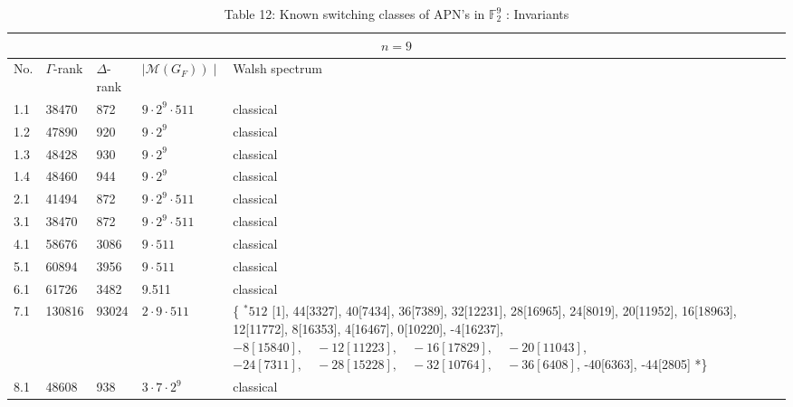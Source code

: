 \documentclass[10pt]{article}
\begin{document}
\begin{table}[h]
\begin{center}
\begin{tabular}{|l|l|l|l|l|}
\hline
\multicolumn{5}{|c|}{$n=9$} \\
\hline
No. & $\Gamma$-rank & $\Delta$-rank & $\left.\mid \mathcal{M}\left(G_{F}\right)\right) \mid$ & Walsh spectrum \\
\hline
1.1 & 38470 & 872 & $9 \cdot 2^{9} \cdot 511$ & classical \\
\hline
1.2 & 47890 & 920 & $9 \cdot 2^{9}$ & classical \\
\hline
1.3 & 48428 & 930 & $9 \cdot 2^{9}$ & classical \\
\hline
1.4 & 48460 & 944 & $9 \cdot 2^{9}$ & classical \\
\hline
2.1 & 41494 & 872 & $9 \cdot 2^{9} \cdot 511$ & classical \\
\hline
3.1 & 38470 & 872 & $9 \cdot 2^{9} \cdot 511$ & classical \\
\hline
4.1 & 58676 & 3086 & $9 \cdot 511$ & classical \\
\hline
5.1 & 60894 & 3956 & $9 \cdot 511$ & classical \\
\hline
6.1 & 61726 & 3482 & 9.511 & classical \\
\hline
7.1 & 130816 & 93024 & $2 \cdot 9 \cdot 511$ & \{ ${ }^{*} 512$ [1], 44[3327], 40[7434], 36[7389], 32[12231], 28[16965], 24[8019], 20[11952], 16[18963], 12[11772], 8[16353], 4[16467], 0[10220], -4[16237], $-8[15840], \quad-12[11223], \quad-16[17829], \quad-20[11043]$, $-24[7311], \quad-28[15228], \quad-32[10764], \quad-36[6408]$, -40[6363], -44[2805] *\} \\
\hline
8.1 & 48608 & 938 & $3 \cdot 7 \cdot 2^{9}$ & classical \\
\hline
\end{tabular}
\captionsetup{labelformat=empty}
\caption{Table 12: Known switching classes of APN's in $\mathbb{F}_{2}^{9}$ : Invariants}
\end{center}
\end{table}
\end{document}
